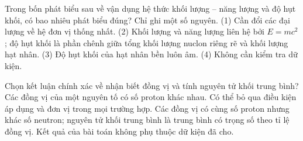 \begin{ex}
Trong bốn phát biểu sau về vận dụng hệ thức khối lượng – năng lượng và độ hụt khối, có bao nhiêu phát biểu đúng? Chỉ ghi một số nguyên. (1) Cần đổi các đại lượng về hệ đơn vị thống nhất. (2) Khối lượng và năng lượng liên hệ bởi $E=mc^2$; độ hụt khối là phần chênh giữa tổng khối lượng nuclon riêng rẽ và khối lượng hạt nhân. (3) Độ hụt khối của hạt nhân bền luôn âm. (4) Không cần kiểm tra dữ kiện.
\end{ex}

\begin{ex}
Chọn kết luận chính xác về nhận biết đồng vị và tính nguyên tử khối trung bình?
\choice
{Các đồng vị của một nguyên tố có số proton khác nhau.}
{Có thể bỏ qua điều kiện áp dụng và đơn vị trong mọi trường hợp.}
{\True Các đồng vị có cùng số proton nhưng khác số neutron; nguyên tử khối trung bình là trung bình có trọng số theo tỉ lệ đồng vị.}
{Kết quả của bài toán không phụ thuộc dữ kiện đã cho.}
\end{ex}

